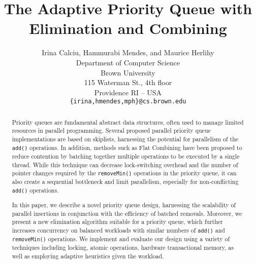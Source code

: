 \documentclass{article}
\begin{document}
\title{The Adaptive Priority Queue with Elimination and Combining}
\author{Irina Calciu, Hammurabi Mendes, and Maurice Herlihy\\
Department of Computer Science\\
Brown University\\
115 Waterman St., 4th floor\\
Providence RI -- USA\\
\texttt{\{irina,hmendes,mph\}@cs.brown.edu}
}

\maketitle

\begin{abstract}
Priority queues are fundamental abstract data structures, often used to manage limited resources in parallel programming. Several proposed parallel priority queue implementations are based on skiplists, harnessing the potential for parallelism of the \texttt{add()} operations. In addition, methods such as Flat Combining have been proposed to reduce contention by batching together multiple operations to be executed by a single thread. While this technique can decrease lock-switching overhead and the number of pointer changes required by the \texttt{removeMin()} operations in the priority queue, it can also create a sequential bottleneck and limit parallelism, especially for non-conflicting \texttt{add()} operations.

In this paper, we describe a novel priority queue design, harnessing the scalability of parallel insertions in conjunction with the efficiency of batched removals. Moreover, we present a new elimination algorithm suitable for a priority queue, which further increases concurrency on balanced workloads with similar numbers of \texttt{add()} and \texttt{removeMin()} operations. We implement and evaluate our design using a variety of techniques including locking, atomic operations, hardware transactional memory, as well as employing adaptive heuristics given the workload.
\end{abstract}















\newpage
\appendix






\end{document}
